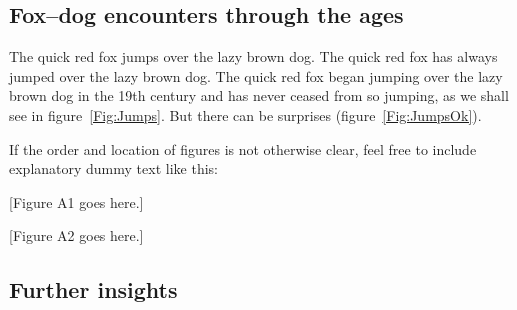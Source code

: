 \documentclass[11pt]{article}
\begin{document}
%
%
%
%
%

\renewcommand{\theequation}{A\arabic{equation}}
\renewcommand{\thetable}{A\arabic{table}}
\setcounter{equation}{0}  %
\setcounter{figure}{0}
\setcounter{table}{0}

\subsection*{Fox--dog encounters through the ages}

The quick red fox jumps over the lazy brown dog. The quick red fox has always jumped over the lazy brown dog. The quick red fox began jumping over the lazy brown dog in the 19th century and has never ceased from so jumping, as we shall see in figure~\ref{Fig:Jumps}. But there can be surprises (figure~\ref{Fig:JumpsOk}).

If the order and location of figures is not otherwise clear, feel free to include explanatory dummy text like this:

[Figure A1 goes here.]

[Figure A2 goes here.]

\subsection*{Further insights}
\end{document}
